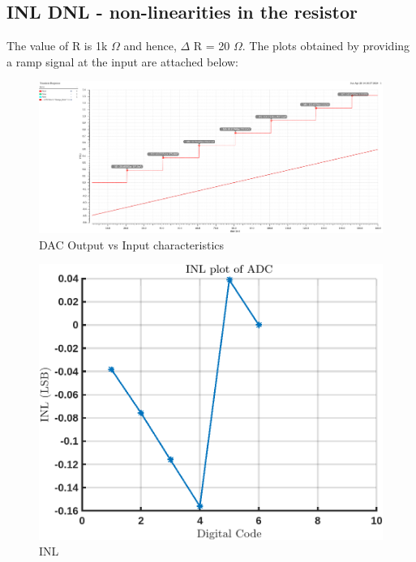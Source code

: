 \documentclass[a4paper,12pt]{article}
\begin{document}
\subsection{INL DNL - non-linearities in the resistor}
The value of R is 1k $\Omega$ and hence, $\Delta$ R = 20 $\Omega$. The plots obtained by providing a ramp signal at the input are attached below:
\begin{figure}[H]
    \centering
    \includegraphics[max width = \textwidth]{Flash_ADC_images/INL_DNL_output.png}
    \caption{DAC Output vs Input characteristics}
    \label{fig:enter-label}
\end{figure}

\begin{figure}[H]
    \centering
    \includegraphics[max width = \textwidth]{Flash_ADC_images/INL.png}
    \caption{INL}
    \label{fig:enter-label}
\end{figure}
\end{document}
